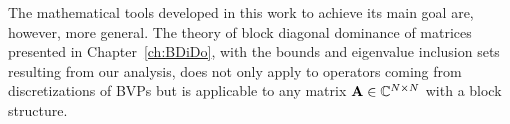 The mathematical tools developed in this work to achieve its main goal are,
however, more general. The theory of block diagonal dominance of matrices
presented in Chapter~\ref{ch:BDiDo}, with the bounds and eigenvalue inclusion
sets resulting from our analysis, does not only apply to operators coming
from discretizations of BVPs but is applicable to any matrix
$\mathbf{A}\in\mathbb{C}^{N\times N}$ with a block structure.

%
%
